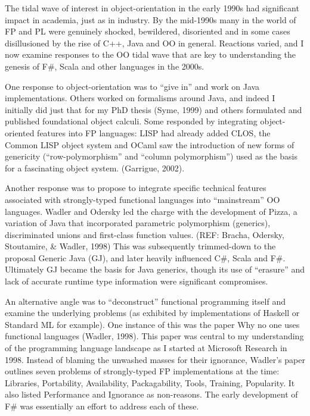 \documentclass[acmsmall,review]{acmart}\settopmatter{printfolios=true,printccs=false,printacmref=false}
\begin{document}
The tidal wave of interest in object-orientation in the early 1990s had significant impact in academia, just as in industry.  By the mid-1990s many in the world of FP and PL were genuinely shocked, bewildered, disoriented and in some cases disillusioned by the rise of C++, Java and OO in general.  Reactions varied, and I now examine responses to the OO tidal wave that are key to understanding the genesis of F\#, Scala and other languages in the 2000s. 

One response to object-orientation was to “give in” and work on Java implementations. Others worked on formalisms around Java, and indeed I initially did just that for my PhD thesis (Syme, 1999) and others formulated and published foundational object calculi. Some responded by integrating object-oriented features into FP languages: LISP had already added CLOS, the Common LISP object system and OCaml saw the introduction of new forms of genericity (“row-polymorphism” and “column polymorphism”) used as the basis for a fascinating object system. (Garrigue, 2002).

Another response was to propose to integrate specific technical features associated with strongly-typed functional languages into “mainstream” OO languages.  Wadler and Odersky led the charge with the development of Pizza, a variation of Java that incorporated parametric polymorphism (generics), discriminated unions and first-class function values. (REF: Bracha, Odersky, Stoutamire, \& Wadler, 1998)  This was subsequently trimmed-down to the proposal Generic Java (GJ), and later heavily influenced C\#, Scala and F\#. Ultimately GJ became the basis for Java generics, though its use of “erasure” and lack of accurate runtime type information were significant compromises. 

An alternative angle was to “deconstruct” functional programming itself and examine the underlying problems (as exhibited by implementations of Haskell or Standard ML for example). One instance of this was the paper Why no one uses functional languages (Wadler, 1998). This paper was central to my understanding of the programming language landscape as I started at Microsoft Research in 1998.  Instead of blaming the unwashed masses for their ignorance, Wadler’s paper outlines seven problems of strongly-typed FP implementations at the time: Libraries, Portability, Availability, Packagability, Tools, Training, Popularity.  It also listed Performance and Ignorance as non-reasons. The early development of F\# was essentially an effort to address each of these.
\end{document}
